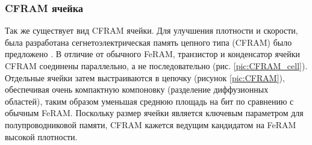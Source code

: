 \documentclass[a4paper,12pt]{article} %
\begin{document}
\subsubsection{CFRAM ячейка}

Так же существует вид CFRAM ячейки.
Для  улучшения плотности и скорости, была разработана  сегнетоэлектрическая память цепного типа (CFRAM)
было предложено \cite{CFRAM}. В отличие от обычного FeRAM, транзистор и конденсатор ячейки CFRAM соединены параллельно, а не последовательно (рис. \ref{pic:CFRAM_cell}). Отдельные ячейки затем выстраиваются в цепочку (рисунок  \ref{pic:CFRAM}), обеспечивая очень компактную компоновку
(разделение диффузионных областей), таким образом уменьшая среднюю площадь на бит по сравнению с обычным FeRAM. Поскольку размер ячейки является ключевым параметром для полупроводниковой памяти, CFRAM кажется ведущим кандидатом на FeRAM высокой плотности.
\end{document}
